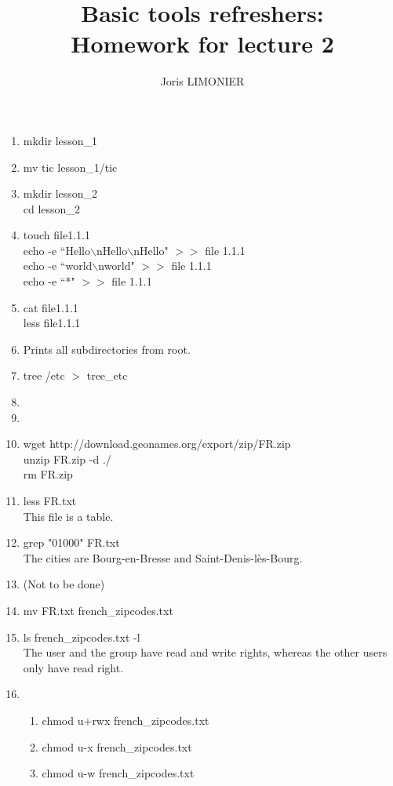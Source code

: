 \documentclass{article}
\title{Basic tools refreshers:\\Homework for lecture 2}
\author{Joris LIMONIER}
\begin{document}
\maketitle


\begin{enumerate}
    \item mkdir lesson\_1
    \item mv tic lesson\_1/tic
    \item mkdir lesson\_2 \\ cd lesson\_2
    \item touch file1.1.1 \\
    echo -e ``Hello\(\backslash\)nHello\(\backslash\)nHello" \(>>\) file 1.1.1 \\
    echo -e ``world\(\backslash\)nworld" \(>>\) file 1.1.1 \\
    echo -e ``*" \(>>\) file 1.1.1
    \item cat file1.1.1 \\
    less file1.1.1
    \item Prints all subdirectories from root.
    \item tree /etc \(>\) tree\_etc
    \item 
    \item 
    \item wget http://download.geonames.org/export/zip/FR.zip \\
    unzip FR.zip -d ./ \\
    rm FR.zip
    \item less FR.txt \\
    This file is a table.
    \item grep "01000" FR.txt \\
    The cities are Bourg-en-Bresse and Saint-Denis-lès-Bourg.
    \item (Not to be done)
    \item mv FR.txt french\_zipcodes.txt
    \item ls french\_zipcodes.txt -l \\
    The user and the group have read and write rights, whereas the other users only have read right.
    \item
    \begin{enumerate}
        \item chmod u+rwx french\_zipcodes.txt
        \item chmod u-x french\_zipcodes.txt
        \item chmod u-w french\_zipcodes.txt
    \end{enumerate}

\end{enumerate}
\end{document}
